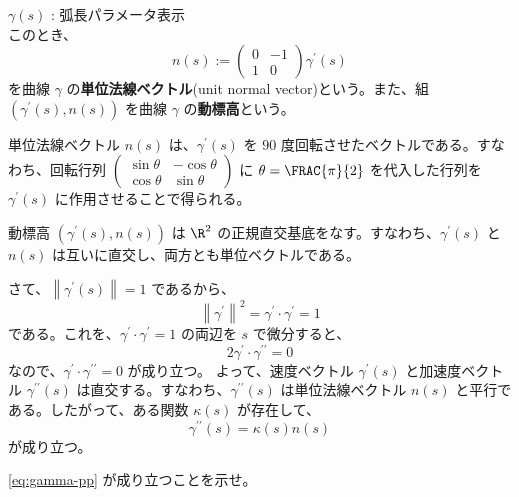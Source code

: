\documentclass[article,paper=a4paper]{jlreq}
\begin{document}
\begin{dfn}
    \quad $\gamma(s)$ : 弧長パラメータ表示\\
    このとき、
    \[n(s) := \begin{pmatrix}
        0 & -1\\
        1 & 0
    \end{pmatrix}\gamma^{\prime}(s)\]
    を曲線 $\gamma$ の\textbf{単位法線ベクトル}(unit normal vector)という。また、組 $(\gamma^{\prime}(s), n(s))$ を曲線 $\gamma$ の\textbf{動標高}という。
\end{dfn}

\begin{rem}
    単位法線ベクトル $n(s)$ は、$\gamma^{\prime}(s)$ を $90$ 度回転させたベクトルである。すなわち、回転行列 $\begin{pmatrix}
        \sin\theta & -\cos\theta\\
        \cos\theta & \sin\theta
    \end{pmatrix}$ に $\theta = \FRAC{\pi}{2}$ を代入した行列を $\gamma^{\prime}(s)$ に作用させることで得られる。
\end{rem}

\begin{rem}
    動標高 $(\gamma^{\prime}(s), n(s))$ は $\R^2$ の正規直交基底をなす。すなわち、$\gamma^{\prime}(s)$ と $n(s)$ は互いに直交し、両方とも単位ベクトルである。
\end{rem}

    さて、$\left\|\gamma^{\prime}(s)\right\| = 1$ であるから、
    \[\left\|\gamma^{\prime}\right\|^2 = \gamma^{\prime} \cdot \gamma^{\prime} = 1\]
    である。これを、$\gamma^{\prime} \cdot \gamma^{\prime} = 1$ の両辺を $s$ で微分すると、
    \[2\gamma^{\prime} \cdot \gamma^{\prime\prime} = 0\]
    なので、$\gamma^{\prime} \cdot \gamma^{\prime\prime} = 0$ が成り立つ。
    よって、速度ベクトル $\gamma^{\prime}(s)$ と加速度ベクトル $\gamma^{\prime\prime}(s)$ は直交する。すなわち、$\gamma^{\prime\prime}(s)$ は単位法線ベクトル $n(s)$ と平行である。したがって、ある関数 $\kappa(s)$ が存在して、
\begin{equation}
        \gamma^{\prime\prime}(s) = \kappa(s) n(s)
        \label{eq:gamma-pp}
    \end{equation}
    が成り立つ。

\begin{prob}
    \cref{eq:gamma-pp} が成り立つことを示せ。
\end{prob}
\end{document}
